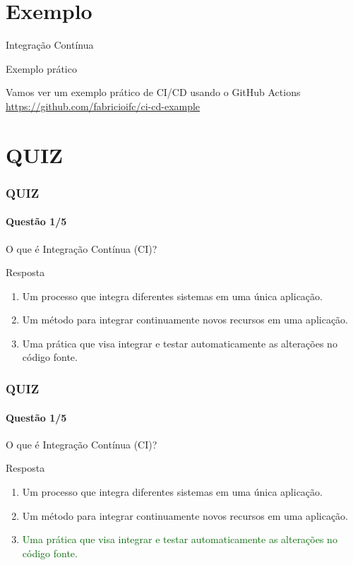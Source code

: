 \documentclass[
	9pt, %
	t, %
]{beamer}
\newcommand{\iconLink}[2]{\href{#1}{\faLink \hspace{0.2em} {#2}}}
\begin{document}
\section{Exemplo}

\begin{frame}
	\begin{center}
		
		\bigskip\bigskip\bigskip\bigskip %
		{\Large Integração Contínua}
		
		\bigskip\bigskip %
		{\Huge Exemplo prático}
		
		\bigskip \bigskip
		{\small Vamos ver um exemplo prático de CI/CD usando o GitHub Actions}\\
		{\small \iconLink{https://github.com/fabricioifc/ci-cd-example}{https://github.com/fabricioifc/ci-cd-example}}
	\end{center}

\end{frame}

\section{QUIZ}

\begin{frame}
	\frametitle{QUIZ}
	\framesubtitle{Questão 1/5}

	{\Large O que é Integração Contínua (CI)?}

	\begin{exampleblock}{Resposta}
		\begin{enumerate}[a]
			\item Um processo que integra diferentes sistemas em uma única aplicação.
			\item Um método para integrar continuamente novos recursos em uma aplicação.
			\item Uma prática que visa integrar e testar automaticamente as alterações no código fonte.
		\end{enumerate}
	\end{exampleblock}

\end{frame}

\begin{frame}
	\frametitle{QUIZ}
	\framesubtitle{Questão 1/5}

	{\Large O que é Integração Contínua (CI)?}

	\begin{exampleblock}{Resposta}
		\begin{enumerate}[a]
			\item Um processo que integra diferentes sistemas em uma única aplicação.
			\item Um método para integrar continuamente novos recursos em uma aplicação.
			\item \textcolor{darkgreen}{Uma prática que visa integrar e testar automaticamente as alterações no código fonte.}
		\end{enumerate}
	\end{exampleblock}

\end{frame}
\end{document}
